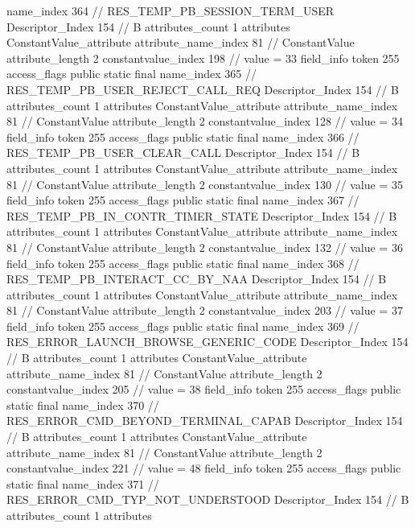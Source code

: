 {{{{{				name_index	364		// RES_TEMP_PB_SESSION_TERM_USER
				Descriptor_Index	154		// B
				attributes_count	1
				attributes {
				ConstantValue_attribute {
					attribute_name_index	81		// ConstantValue
					attribute_length	2
					constantvalue_index	198		// value = 33
				}
				}
			}
			field_info {
				token	255
				access_flags	public static final
				name_index	365		// RES_TEMP_PB_USER_REJECT_CALL_REQ
				Descriptor_Index	154		// B
				attributes_count	1
				attributes {
				ConstantValue_attribute {
					attribute_name_index	81		// ConstantValue
					attribute_length	2
					constantvalue_index	128		// value = 34
				}
				}
			}
			field_info {
				token	255
				access_flags	public static final
				name_index	366		// RES_TEMP_PB_USER_CLEAR_CALL
				Descriptor_Index	154		// B
				attributes_count	1
				attributes {
				ConstantValue_attribute {
					attribute_name_index	81		// ConstantValue
					attribute_length	2
					constantvalue_index	130		// value = 35
				}
				}
			}
			field_info {
				token	255
				access_flags	public static final
				name_index	367		// RES_TEMP_PB_IN_CONTR_TIMER_STATE
				Descriptor_Index	154		// B
				attributes_count	1
				attributes {
				ConstantValue_attribute {
					attribute_name_index	81		// ConstantValue
					attribute_length	2
					constantvalue_index	132		// value = 36
				}
				}
			}
			field_info {
				token	255
				access_flags	public static final
				name_index	368		// RES_TEMP_PB_INTERACT_CC_BY_NAA
				Descriptor_Index	154		// B
				attributes_count	1
				attributes {
				ConstantValue_attribute {
					attribute_name_index	81		// ConstantValue
					attribute_length	2
					constantvalue_index	203		// value = 37
				}
				}
			}
			field_info {
				token	255
				access_flags	public static final
				name_index	369		// RES_ERROR_LAUNCH_BROWSE_GENERIC_CODE
				Descriptor_Index	154		// B
				attributes_count	1
				attributes {
				ConstantValue_attribute {
					attribute_name_index	81		// ConstantValue
					attribute_length	2
					constantvalue_index	205		// value = 38
				}
				}
			}
			field_info {
				token	255
				access_flags	public static final
				name_index	370		// RES_ERROR_CMD_BEYOND_TERMINAL_CAPAB
				Descriptor_Index	154		// B
				attributes_count	1
				attributes {
				ConstantValue_attribute {
					attribute_name_index	81		// ConstantValue
					attribute_length	2
					constantvalue_index	221		// value = 48
				}
				}
			}
			field_info {
				token	255
				access_flags	public static final
				name_index	371		// RES_ERROR_CMD_TYP_NOT_UNDERSTOOD
				Descriptor_Index	154		// B
				attributes_count	1
				attributes {
}}}}}}
